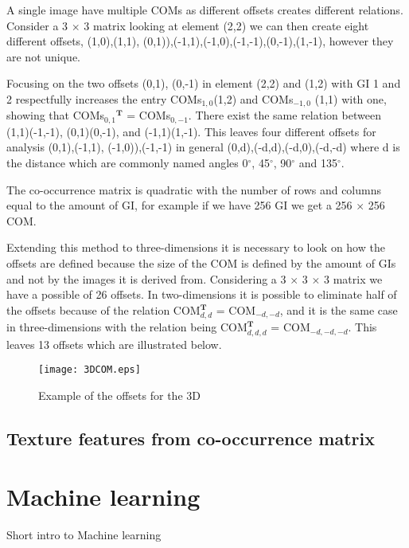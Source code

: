 A single image have multiple COMs as different offsets creates different relations. Consider a 3 $\times$ 3 matrix looking at element (2,2) we can then create eight different offsets, {(1,0),(1,1), (0,1)),(-1,1),(-1,0),(-1,-1),(0,-1),(1,-1)}, however they are not unique. 

Focusing on the two offsets {(0,1), (0,-1)} in element (2,2) and (1,2) with GI 1 and 2 respectfully increases the entry COMs$_{1,0}$(1,2) and COMs$_{-1,0}$ (1,1) with one, showing that COMs$_{0,1}$$^\textbf{T}$ = COMs$_{0,-1}$. There exist the same relation between (1,1)(-1,-1), (0,1)(0,-1), and (-1,1)(1,-1). This leaves four different offsets for analysis {(0,1),(-1,1), (-1,0)),(-1,-1)} in general {(0,d),(-d,d),(-d,0),(-d,-d)} where d is the distance which are commonly named angles 0$^\circ$, 45$^\circ$, 90$^\circ$ and 135$^\circ$.

The co-occurrence matrix is quadratic with the number of rows and columns equal to the amount of GI, for example if we have 256 GI we get a 256 $\times$ 256 COM.

Extending this method to three-dimensions it is necessary to look on how the offsets are defined because the size of the COM is defined by the amount of GIs and not by the images it is derived from. Considering a 3 $\times$ 3 $\times$ 3 matrix we have a possible of 26 offsets. In two-dimensions it is possible to eliminate half of the offsets because of the relation COM$_{d,d}^\textbf{T}$ = COM$_{-d,-d}$, and it is the same case in three-dimensions with the relation being COM$_{d,d,d}^\textbf{T}$ = COM$_{-d,-d,-d}$. This leaves 13 offsets which are illustrated below.\\

\begin{figure}[H]
  \centering
  \texttt{[image: 3DCOM.eps]}
  \caption{Example of the offsets for the 3D}\label{3DCOM}
\end{figure}


\subsection{Texture features from co-occurrence matrix}

\section{Machine learning}
Short intro to Machine learning

